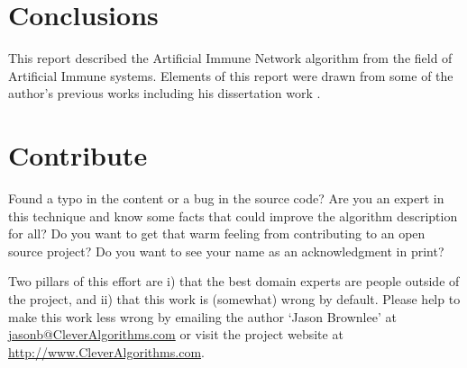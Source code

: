 \documentclass[a4paper, 11pt]{article}
\makeatletter
\newcommand{\myreportauthor}{Jason Brownlee}
\newcommand{\myreportemail}{jasonb@CleverAlgorithms.com}
\newcommand{\myreportwebsite}{http://www.CleverAlgorithms.com}
\makeatother
\begin{document}
\section{Conclusions}
\label{sec:conclusions}
This report described the Artificial Immune Network algorithm from the field of Artificial Immune systems.
Elements of this report were drawn from some of the author's previous works including his dissertation work \cite{Brownlee2008}.

% 
% 
\section{Contribute}
\label{sec:contribute}
Found a typo in the content or a bug in the source code? 
Are you an expert in this technique and know some facts that could improve the algorithm description for all?
Do you want to get that warm feeling from contributing to an open source project? 
Do you want to see your name as an acknowledgment in print?

Two pillars of this effort are i) that the best domain experts are people outside of the project, and ii) that this work is (somewhat) wrong by default. 
Please help to make this work less wrong by emailing the author `\myreportauthor' at \url{\myreportemail} or visit the project website at \url{\myreportwebsite}.



\end{document}
